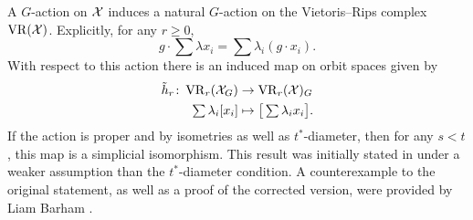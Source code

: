 A \(G\)-action on $\mathcal{X}$ induces a natural \(G\)-action on the Vietoris--Rips complex $\operatorname{VR}(\mathcal{X})$.
Explicitly, for any \(r \geq 0\),
\[
g \cdot \sum \lambda x_i = \sum \lambda_i (g\cdot x_i).
\]
With respect to this action there is an induced map on orbit spaces given by
\begin{align*}
	\tilde h_r \colon \operatorname{VR}_r(\mathcal{X}_G) &\to \operatorname{VR}_r(\mathcal{X})_G \\
	\textstyle\sum\lambda_i [x_i] &\mapsto \textstyle \big[\sum\lambda_i x_i\big].
\end{align*}
If the action is proper and by isometries as well as \(t^*\)-diameter, then for any \(s < t\), this map is a simplicial isomorphism. 
This result was initially stated in \cite[Prop.~3.5]{adams2022metric} under a weaker assumption than the \(t^*\)-diameter condition.
A counterexample to the original statement, as well as a proof of the corrected version, were provided by Liam Barham \cite{bibid}.



%

